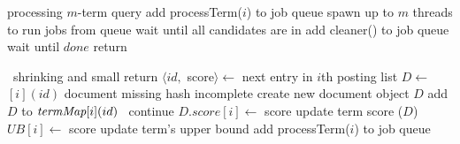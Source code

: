 
\begin{algorithm*}[tbh]
\small
\begin{multicols}{2}
\begin{algorithmic}[1]
 \Comment processing $m$-term query
\State add {\sc processTerm($i$)} to job queue \label{l:par-init-job}
\EndFor
\State spawn up to $m$  threads to run jobs from queue\label{l:start-threads}
\State wait until \RAStop
	\Comment all candidates  are in \DMap
\State add {\sc cleaner()} to job queue %
\State wait until $done$
\State return \DHeap \label{l:par-end}
%

\Statex 
{} 
	\If{\RAStop\, $\wedge\, |\DMap | < \Phi$} %
		\Statex \Comment \DMap\  shrinking and small
		\If{$\TMap[i]=\DMap$}  \label{l:hash-start}
	  	\EndIf 
	\EndIf \label{l:hash-end}
		 return \EndIf
    		\State $\langle id,$ score$\rangle \leftarrow$ next entry in $i$th posting list
		\State $D \leftarrow$ \TMap$[i](id)$
 	  		 \Comment document missing 
 	  			\If{$\neg$\RAStop} \Comment hash incomplete
		 			\State create new document object $D$
 					\State add $D$ to $\textit{termMap}[i](id)$
				\Else\ continue
				\EndIf
    			\EndIf
        			\State $D.score[i] \leftarrow$ score \Comment update term  score
				($D$)
			\EndIf	
	\EndFor %
	\State $UB[i] \leftarrow$ score \Comment update term's upper bound \label{l:thread-update-ub}    
	\State add {\sc processTerm($i$)} to job queue \label{l:new-task}
\EndProcedure

\Statex


\end{algorithmic}
\end{multicols}
\end{algorithm*}
